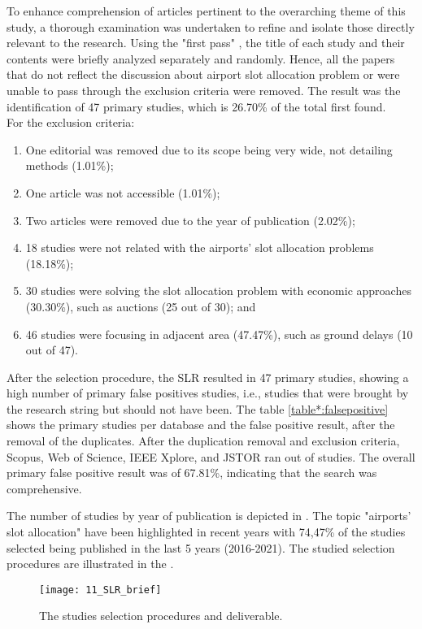 To enhance comprehension of articles pertinent to the overarching theme of this study, a thorough examination was undertaken to refine and isolate those directly relevant to the research. Using the "first pass" \cite{wohlin2012experimentation}, the title of each study and their contents were briefly analyzed separately and randomly. Hence, all the papers that do not reflect the discussion about airport slot allocation problem or were unable to pass through the exclusion criteria were removed. The result was the identification of 47 primary studies, which is 26.70\% of the total first found.
\\

For the exclusion criteria: 
\begin{enumerate}
    \item One editorial was removed due to its scope being very wide, not detailing methods (1.01\%);
    \item One article was not accessible (1.01\%);
    \item Two articles were removed due to the year of publication (2.02\%);
    \item 18 studies were not related with the airports' slot allocation problems (18.18\%);
    \item 30 studies were solving the slot allocation problem with economic approaches (30.30\%), such as auctions (25 out of 30); and
    \item 46 studies were focusing in adjacent area (47.47\%), such as ground delays (10 out of 47).
\end{enumerate}

After the selection procedure, the SLR resulted in 47 primary studies, showing a high number of primary false positives studies, i.e., studies that were brought by the research string but should not have been. The table \ref{table*:falsepositive} shows the primary studies per database and the false positive result, after the removal of the duplicates. After the duplication removal and exclusion criteria, Scopus, Web of Science, IEEE Xplore, and JSTOR ran out of studies. The overall primary false positive result was of 67.81\%, indicating that the search was comprehensive. 



The number of studies by year of publication is depicted in . The topic "airports' slot allocation" have been highlighted in recent years with 74,47\% of the studies selected being published in the last 5 years (2016-2021). The studied selection procedures are illustrated in the .

%

\begin{wrapfigure}{L}{6cm}
\caption{The studies selection procedures and deliverable.}\label{fig:resumeSLR}
\texttt{[image: 11\_SLR\_brief]}
\end{wrapfigure} 

\lipsum[1-2]

